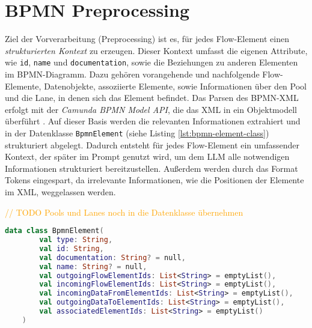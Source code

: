 \section{BPMN Preprocessing}\label{sec:bpmn-preprocessing}

Ziel der Vorverarbeitung (Preprocessing) ist es, für jedes Flow-Element einen \emph{strukturierten Kontext} zu erzeugen. Dieser Kontext umfasst die eigenen Attribute, wie \texttt{id}, \texttt{name} und \texttt{documentation}, sowie die Beziehungen zu anderen Elementen im BPMN-Diagramm. Dazu gehören vorangehende und nachfolgende Flow-Elemente, Datenobjekte, assoziierte Elemente, sowie Informationen über den Pool und die Lane, in denen sich das Element befindet. Das Parsen des \ac{BPMN}-XML erfolgt mit der \emph{Camunda BPMN Model API}, die das XML in ein Objektmodell überführt \cite{camunda-bpmn-model-api, camunda-bpmn-model-read}. Auf dieser Basis werden die relevanten Informationen extrahiert und in der Datenklasse \texttt{BpmnElement} (siehe Listing \ref{lst:bpmn-element-class}) strukturiert abgelegt. Dadurch entsteht für jedes Flow-Element ein umfassender Kontext, der später im Prompt genutzt wird, um dem \ac{LLM} alle notwendigen Informationen strukturiert bereitzustellen. Außerdem werden durch das Format Tokens eingespart, da irrelevante Informationen, wie die Positionen der Elemente im XML, weggelassen werden.

\textcolor{orange}{// TODO Pools und Lanes noch in die Datenklasse übernehmen}

\begin{lstlisting}[language=Kotlin,caption={Interne \ac{BPMN}-Repräsentation je Flow-Element.},label={lst:bpmn-element-class}]
    data class BpmnElement(
        val type: String,
        val id: String,
        val documentation: String? = null,
        val name: String? = null,
        val outgoingFlowElementIds: List<String> = emptyList(),
        val incomingFlowElementIds: List<String> = emptyList(),
        val incomingDataFromElementIds: List<String> = emptyList(),
        val outgoingDataToElementIds: List<String> = emptyList(),
        val associatedElementIds: List<String> = emptyList()
    )
\end{lstlisting}